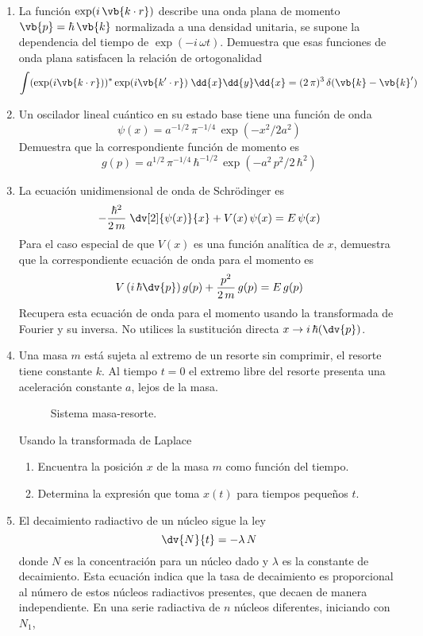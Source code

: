 \begin{enumerate}
\item La función $\exp(i \, \vb{k \cdot r})$ describe una onda plana de momento $\vb{p} = \hbar \, \vb{k}$ normalizada a una densidad unitaria, se supone la dependencia del tiempo de $\exp(-i \, \omega t)$. Demuestra que esas funciones de onda plana satisfacen la relación de ortogonalidad
\[ \int ( \exp(i \vb{k \cdot r} ))^{*}  \exp(i \vb{k^{\prime} \cdot r}) \; \dd{x} \dd{y} \dd{x} =  (2 \, \pi)^{3} \, \delta(\vb{k} - \vb{k}^{\prime})  \]
\item Un oscilador lineal cuántico en su estado base tiene una función de onda
\[ \psi(x) = a^{-1/2} \, \pi^{-1/4} \, \exp(-x^{2}/2a^{2}) \]
Demuestra que la correspondiente función de momento es
\[ g(p) = a^{1/2} \, \pi^{-1/4} \, \hbar^{-1/2} \, \exp(-a^{2} \, p^{2}/2 \, \hbar^{2}) \]
\item La ecuación unidimensional de onda de Schrödinger es
\[ - \dfrac{\hbar^{2}}{2 \, m} \; \dv[2]{\psi(x)}{x} +  V(x) \, \psi(x) = E \, \psi (x) \]
Para el caso especial de que $V(x)$ es una función analítica de $x$, demuestra que la correspondiente ecuación de onda para el momento es
\[ V \left( i \, \hbar \dv{p} \right) g(p) + \dfrac{p^{2}}{2 \, m} \, g(p) =  E \, g(p)  \]
Recupera esta ecuación de onda para el momento usando la transformada de Fourier y su inversa. No utilices la sustitución directa $\displaystyle{x \to i \, \hbar (\dv{p})}$.
\item Una masa $m$ está sujeta al extremo de un resorte sin comprimir, el resorte tiene constante $k$. Al tiempo $t=0$ el extremo libre del resorte presenta una aceleración constante $a$, lejos de la masa. 
\begin{figure}[H]
\centering

\caption{Sistema masa-resorte.}
\label{fig:figura1}
\end{figure}
Usando la transformada de Laplace
\begin{enumerate}[label=\alph*)]
\item Encuentra la posición $x$ de la masa $m$ como función del tiempo.
\item Determina la expresión que toma $x(t)$ para tiempos pequeños $t$.
\end{enumerate}
\item El decaimiento radiactivo de un núcleo sigue la ley
\[ \dv{N}{t} = - \lambda \, N \]
donde $N$ es la concentración para un núcleo dado y $\lambda$ es la constante de decaimiento. Esta ecuación indica que la tasa de decaimiento es proporcional al número de estos núcleos radiactivos presentes, que decaen de manera independiente. En una serie radiactiva de $n$ núcleos diferentes, iniciando con $N_{1}$,

\end{enumerate}
